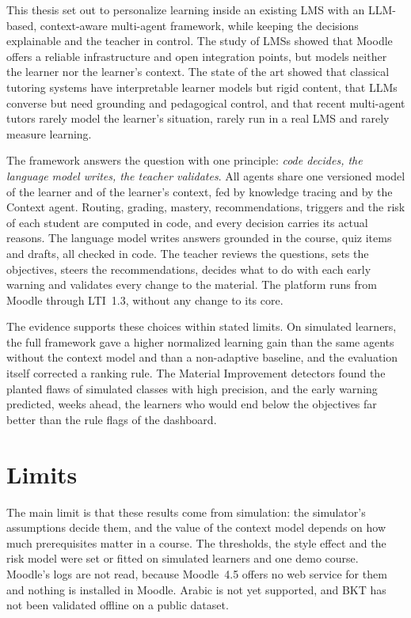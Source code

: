 \label{chap-conclusion}

This thesis set out to personalize learning inside an existing LMS with
an LLM-based, context-aware multi-agent framework, while keeping the
decisions explainable and the teacher in control. The study of LMSs
showed that Moodle offers a reliable infrastructure and open integration
points, but models neither the learner nor the learner's context. The
state of the art showed that classical tutoring systems have
interpretable learner models but rigid content, that LLMs converse but
need grounding and pedagogical control, and that recent multi-agent
tutors rarely model the learner's situation, rarely run in a real LMS and
rarely measure learning.

The framework answers the question with one principle: \emph{code
decides, the language model writes, the teacher validates}. All agents
share one versioned model of the learner and of the learner's context,
fed by knowledge tracing and by the Context agent. Routing, grading,
mastery, recommendations, triggers and the risk of each student are
computed in code, and every decision carries its actual reasons. The
language model writes answers grounded in the course, quiz items and
drafts, all checked in code. The teacher reviews the questions, sets the
objectives, steers the recommendations, decides what to do with each
early warning and validates every change to the material. The platform
runs from Moodle through LTI~1.3, without any change to its core.

The evidence supports these choices within stated limits. On simulated
learners, the full framework gave a higher normalized learning gain than
the same agents without the context model and than a non-adaptive
baseline, and the evaluation itself corrected a ranking rule. The
Material Improvement detectors found the planted flaws of simulated
classes with high precision, and the early warning predicted, weeks
ahead, the learners who would end below the objectives far better than
the rule flags of the dashboard.

\section*{Limits}

The main limit is that these results come from simulation: the
simulator's assumptions decide them, and the value of the context model
depends on how much prerequisites matter in a course. The thresholds,
the style effect and the risk model were set or fitted on simulated
learners and one demo course. Moodle's logs are not read, because
Moodle~4.5 offers no web service for them and nothing is installed in
Moodle. Arabic is not yet supported, and BKT has not been validated
offline on a public dataset.

